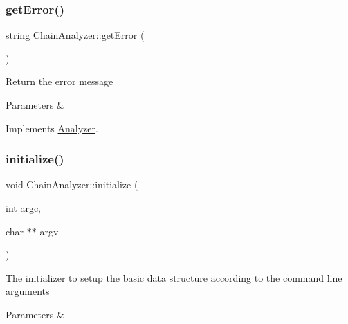 \mbox{\label{class_chain_analyzer_ae8cd5d49f3f41c4fd25baea14a80f929}} 
\subsubsection{\texorpdfstring{get\+Error()}{getError()}}
{\footnotesize\ttfamily string Chain\+Analyzer\+::get\+Error (\begin{DoxyParamCaption}{ }\end{DoxyParamCaption})\hspace{0.3cm}{\ttfamily [virtual]}}

Return the error message


\begin{DoxyParams}{Parameters}
{\em } & \\
\hline
\end{DoxyParams}


Implements \mbox{\hyperlink{class_analyzer}{Analyzer}}.

\mbox{\label{class_chain_analyzer_aac68bba73899bc53d6cd3c05877d9f85}} 
\subsubsection{\texorpdfstring{initialize()}{initialize()}\hspace{0.1cm}{\footnotesize\ttfamily [1/2]}}
{\footnotesize\ttfamily void Chain\+Analyzer\+::initialize (\begin{DoxyParamCaption}\item[{int}]{argc,  }\item[{char $\ast$$\ast$}]{argv }\end{DoxyParamCaption})}

The initializer to setup the basic data structure according to the command line arguments


\begin{DoxyParams}{Parameters}
{\em } & \\
\hline
\end{DoxyParams}
\mbox{\label{class_chain_analyzer_a1252905ce86f9e730263b083f85909f9}} 
